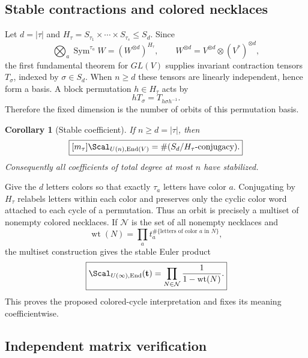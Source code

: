 \documentclass[10pt]{article}
\newcommand{\Sym}{\operatorname{Sym}}
\newcommand{\End}{\operatorname{End}}
\newtheorem{corollary}{Corollary}
\begin{document}
\subsection{Stable contractions and colored necklaces}

Let $d=|\tau|$ and
$H_\tau=S_{\tau_1}\times\cdots\times S_{\tau_s}\leq S_d$.  Since
\[
  \bigotimes_a\Sym^{\tau_a}W=(W^{\otimes d})^{H_\tau},
  \qquad
  W^{\otimes d}=V^{\otimes d}\otimes(V^*)^{\otimes d},
\]
the first fundamental theorem for $GL(V)$ supplies invariant contraction
tensors $T_\sigma$, indexed by $\sigma\in S_d$.  When $n\geq d$ these tensors
are linearly independent, hence form a basis.  A block permutation
$h\in H_\tau$ acts by
\[
  hT_\sigma=T_{h\sigma h^{-1}}.
\]
Therefore the fixed dimension is the number of orbits of this permutation
basis.

\begin{corollary}[Stable coefficient]\label{unitary-conjugation-proof-and-verification:cor:stable}
If $n\geq d=|\tau|$, then
\begin{equation}\label{unitary-conjugation-proof-and-verification:eq:orbits}
  \boxed{
  [m_\tau]\Scal_{U(n),\End(V)}
  =\#(S_d/H_\tau\text{-conjugacy}).}
\end{equation}
Consequently all coefficients of total degree at most $n$ have stabilized.
\end{corollary}

Give the $d$ letters colors so that exactly $\tau_a$ letters have color $a$.
Conjugating by $H_\tau$ relabels letters within each color and preserves only
the cyclic color word attached to each cycle of a permutation.  Thus an orbit
is precisely a multiset of nonempty colored necklaces.  If $\mathcal N$ is
the set of all nonempty necklaces and
\[
  \operatorname{wt}(N)=\prod_a t_a^{\#\{\text{letters of color }a\text{ in }N\}},
\]
the multiset construction gives the stable Euler product
\begin{equation}\label{unitary-conjugation-proof-and-verification:eq:necklace}
  \boxed{
  \Scal_{U(\infty),\End}(\mathbf t)
  =\prod_{N\in\mathcal N}\frac{1}{1-\operatorname{wt}(N)}.}
\end{equation}
This proves the proposed colored-cycle interpretation and fixes its meaning
coefficientwise.

\subsection{Independent matrix verification}
\end{document}
